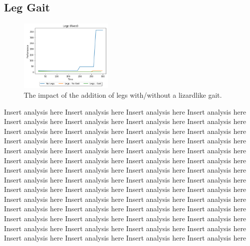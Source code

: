 \documentclass{article}
\begin{document}
\subsection{Leg Gait}
\begin{figure}
    \centering
    \vspace*{-5mm}
    \includegraphics[width=0.4\textwidth]{legResults}
    \vspace*{-7mm}
    \caption{The impact of the addition of legs with/without a lizardlike gait.}
\end{figure}
Insert analysis here Insert analysis here Insert analysis here Insert analysis here Insert analysis here Insert analysis here Insert analysis here Insert analysis here Insert analysis here Insert analysis here Insert analysis here Insert analysis here Insert analysis here Insert analysis here Insert analysis here Insert analysis here Insert analysis here Insert analysis here Insert analysis here Insert analysis here Insert analysis here Insert analysis here Insert analysis here Insert analysis here Insert analysis here Insert analysis here Insert analysis here Insert analysis here Insert analysis here Insert analysis here Insert analysis here Insert analysis here Insert analysis here Insert analysis here Insert analysis here Insert analysis here Insert analysis here Insert analysis here Insert analysis here Insert analysis here Insert analysis here Insert analysis here Insert analysis here Insert analysis here Insert analysis here Insert analysis here Insert analysis here Insert analysis here Insert analysis here Insert analysis here Insert analysis here Insert analysis here Insert analysis here Insert analysis here Insert analysis here Insert analysis here
\end{document}

